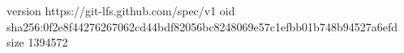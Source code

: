 version https://git-lfs.github.com/spec/v1
oid sha256:0f2e8f44276267062cd44bdf82056bc8248069e57c1efbb01b748b94527a6efd
size 1394572
